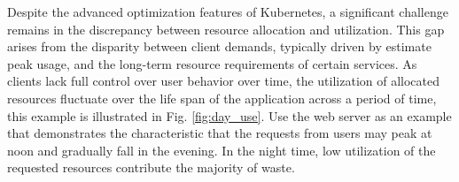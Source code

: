 


Despite the advanced optimization features of Kubernetes, a significant challenge remains in the discrepancy between resource allocation and utilization. This gap arises from the disparity between client demands, typically driven by estimate peak usage, and the long-term resource requirements of certain services. As clients lack full control over user behavior over time, the utilization of allocated resources fluctuate over the life span of the application across a period of time, this example is illustrated in Fig. \ref{fig:day_use}. Use the web server as an example that demonstrates the characteristic that the requests from users may peak at noon and gradually fall in the evening. In the night time, low utilization of the requested resources contribute the majority of waste. 

